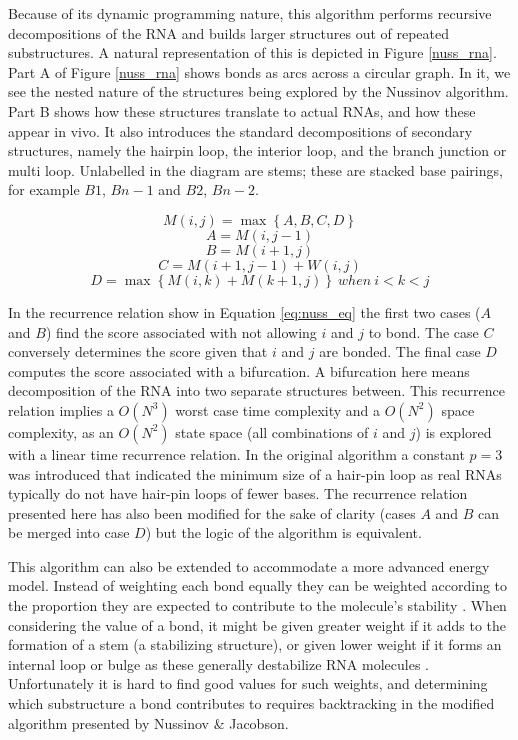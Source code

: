 \documentclass{cshonours}
\begin{document}
Because of its dynamic programming
nature, this algorithm performs recursive decompositions of the RNA and builds
larger structures out of repeated substructures. A natural representation of this is
depicted in Figure \ref{nuss_rna}. Part A of Figure \ref{nuss_rna} shows bonds as arcs across a circular
graph. In it, we see the nested nature of the structures being explored by the
Nussinov algorithm. Part B shows how these structures translate to actual RNAs,
and how these appear in vivo. It also introduces the standard decompositions
of secondary structures, namely the hairpin loop, the interior loop, and the branch
junction or multi loop. Unlabelled in the diagram are stems; these are stacked
base pairings, for example $B1$, $Bn - 1$ and $B2$, $Bn - 2$.


\begin{equation} \label{eq:nuss_eq}
	M(i, j) = \max \left\lbrace A, B, C, D \right\rbrace 
\end{equation}
\[
A = M(i, j-1)
\]
\[
B = M(i+1, j)
\]
\[
C = M(i+1, j-1) + W(i, j)
\]
\[
D = \max \left\lbrace M(i, k) + M(k+1, j) \right\rbrace \: when \: i < k < j
\]



In the recurrence relation show in Equation \ref{eq:nuss_eq} the first two cases ($A$ and $B$) find the score associated with not allowing $i$ and $j$ to bond. The case $C$ conversely determines the score given that $i$ and $j$ are bonded. The final case $D$ computes the score associated with a bifurcation. A bifurcation here means decomposition of the RNA into two separate structures between. This recurrence relation implies a $O(N^3)$
worst case time complexity and a $O(N^2)$ space complexity, as an $O(N^2)$ state space (all combinations of $i$ and $j$) is explored
with a linear time recurrence relation. In the original algorithm a constant $p = 3$ was introduced that indicated the minimum size of a hair-pin loop as real RNAs typically do not have hair-pin loops of fewer bases. The recurrence relation presented here has also been modified for the sake of clarity (cases $A$ and $B$ can be merged into case $D$) but the logic of the algorithm is equivalent.


This algorithm can also be extended to accommodate a more advanced energy
model. Instead of weighting each bond equally they can be weighted
according to the proportion they are expected to contribute to the molecule’s
stability \cite{nussinov1980fast}. When considering the value of a bond, it might be given greater
weight if it adds to the formation of a stem (a stabilizing structure), or
given lower weight if it forms an internal loop or bulge as these generally
destabilize RNA molecules \cite{nussinov1980fast}. Unfortunately it is hard to find good values for
such weights, and determining which substructure a bond contributes to requires
backtracking in the modified algorithm presented by Nussinov \& Jacobson.
\end{document}
